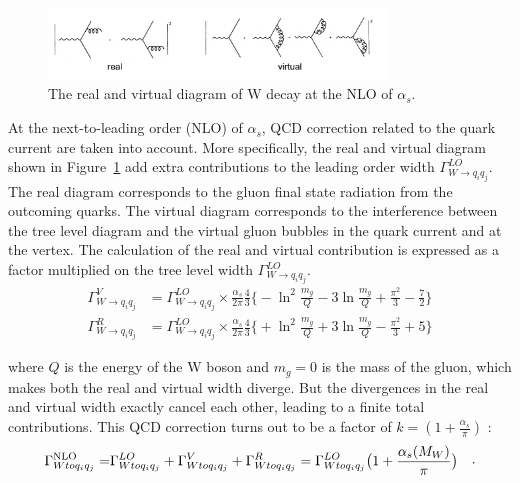 
\begin{figure}
    \centering
    \includegraphics[width=0.8\textwidth]{chapters/RelatedWorks/sectionVcs/figures/realVirtual.png}
    \caption{ The real and virtual diagram of W decay at the NLO of $\alpha_s$. }
    \label{fig:relatedWorks:vcs:realVirtual}
\end{figure}


\noindent At the next-to-leading order (NLO) of $\alpha_s$, QCD correction related to the quark current are taken into account. More specifically, the real and virtual diagram shown in Figure~\ref{fig:relatedWorks:vcs:realVirtual} add extra contributions to the leading order width $\Gamma_{W \to q_i q_j}^{LO} $. The real diagram corresponds to the gluon final state radiation from the outcoming quarks. The virtual diagram corresponds to the interference between the tree level diagram and the virtual gluon bubbles in the quark current and at the vertex. The calculation of the real and virtual contribution is expressed as a factor multiplied on the tree level width  $\Gamma_{W \to q_i q_j}^{LO} $.
 \begin{align}
 	\Gamma^V_{W \to q_i q_j}  &= \Gamma_{W \to q_i q_j}^{LO} \times \frac{\alpha_s}{2\pi}\frac{4}{3} \bigg \{  -\ln^2\frac{m_g}{Q} -3 \ln\frac{m_g}{Q} + \frac{\pi^2}{3}-\frac{7}{2} \bigg\} \\
    \Gamma^R_{W \to q_i q_j}  &= \Gamma_{W \to q_i q_j}^{LO} \times \frac{\alpha_s}{2\pi}\frac{4}{3} \bigg \{  +\ln^2\frac{m_g}{Q} + 3 \ln\frac{m_g}{Q} - \frac{\pi^2}{3}+ 5 \bigg\}
\end{align}
 
\noindent  where $Q$ is the energy of the W boson and $m_g=0$ is the mass of the gluon, which makes both the real and virtual width diverge. But the divergences in the real and virtual width exactly cancel each other, leading to a finite total contributions. This QCD correction turns out to be a factor of $k=(1+\frac{\alpha_s}{\pi})$ :
\begin{equation}
\begin{split}
    \Gamma_{W \to q_i q_j}^{\rm NLO} =& \Gamma_{W \to q_i q_j}^{LO} + \Gamma^{V}_{W \to q_i q_j}  + \Gamma^{R}_{W \to q_i q_j}
            =   \Gamma_{W \to q_i q_j}^{LO} \big( 1+ \frac{\alpha_s(M_W)}{\pi}\big)
\end{split} .
\end{equation}

